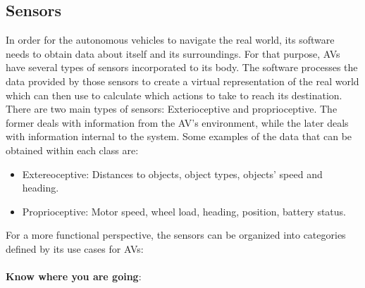 \documentclass[11pt]{article}
\begin{document}
\subsection{Sensors}
In order for the autonomous vehicles to navigate the real world, its software needs to obtain data about itself and its surroundings. For that purpose, AVs have several types of sensors incorporated to its body. The software processes the data provided by those sensors to create a virtual representation of the real world which can then use to calculate which actions to take to reach its destination. There are two main types of sensors: Exterioceptive and proprioceptive. The former deals with information from the AV's environment, while the later deals with information internal to the system\cite{BeesonTexas09}. Some examples of the data that can be obtained within each class are:
\begin{itemize}
	\item Extereoceptive: Distances to objects, object types, objects' speed and heading.
	\item Proprioceptive: Motor speed, wheel load, heading, position, battery status.
\end{itemize}
For a more functional perspective, the sensors can be organized into categories defined by its use cases for AVs:
\\\\\textbf{Know where you are going}:
\end{document}
